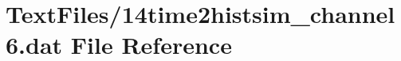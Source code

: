 \hypertarget{14time2histsim__channel6_8dat}{}\section{Text\+Files/14time2histsim\+\_\+channel6.dat File Reference}
\label{14time2histsim__channel6_8dat}
